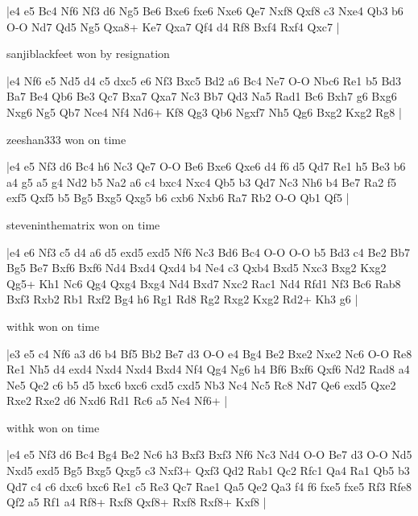 \makegametitle
|e4 e5 Bc4 Nf6 Nf3 d6 Ng5 Be6 Bxe6 fxe6 Nxe6 Qe7 Nxf8 Qxf8 c3 Nxe4 Qb3 b6 O-O Nd7 Qd5 Ng5 Qxa8+ Ke7 Qxa7 Qf4 d4 Rf8 Bxf4 Rxf4 Qxc7  |

\showboard

sanjiblackfeet won by resignation

\makegametitle
|e4 Nf6 e5 Nd5 d4 c5 dxc5 e6 Nf3 Bxc5 Bd2 a6 Bc4 Ne7 O-O Nbc6 Re1 b5 Bd3 Ba7 Be4 Qb6 Be3 Qc7 Bxa7 Qxa7 Nc3 Bb7 Qd3 Na5 Rad1 Bc6 Bxh7 g6 Bxg6 Nxg6 Ng5 Qb7 Nce4 Nf4 Nd6+ Kf8 Qg3 Qb6 Ngxf7 Nh5 Qg6 Bxg2 Kxg2 Rg8  |

\showboard

zeeshan333 won on time

\makegametitle
|e4 e5 Nf3 d6 Bc4 h6 Nc3 Qe7 O-O Be6 Bxe6 Qxe6 d4 f6 d5 Qd7 Re1 h5 Be3 b6 a4 g5 a5 g4 Nd2 b5 Na2 a6 c4 bxc4 Nxc4 Qb5 b3 Qd7 Nc3 Nh6 b4 Be7 Ra2 f5 exf5 Qxf5 b5 Bg5 Bxg5 Qxg5 b6 cxb6 Nxb6 Ra7 Rb2 O-O Qb1 Qf5  |

\showboard

steveninthematrix won on time

\makegametitle
|e4 e6 Nf3 c5 d4 a6 d5 exd5 exd5 Nf6 Nc3 Bd6 Bc4 O-O O-O b5 Bd3 c4 Be2 Bb7 Bg5 Be7 Bxf6 Bxf6 Nd4 Bxd4 Qxd4 b4 Ne4 c3 Qxb4 Bxd5 Nxc3 Bxg2 Kxg2 Qg5+ Kh1 Nc6 Qg4 Qxg4 Bxg4 Nd4 Bxd7 Nxc2 Rac1 Nd4 Rfd1 Nf3 Bc6 Rab8 Bxf3 Rxb2 Rb1 Rxf2 Bg4 h6 Rg1 Rd8 Rg2 Rxg2 Kxg2 Rd2+ Kh3 g6  |

\showboard

withk won on time

\makegametitle
|e3 e5 c4 Nf6 a3 d6 b4 Bf5 Bb2 Be7 d3 O-O e4 Bg4 Be2 Bxe2 Nxe2 Nc6 O-O Re8 Re1 Nh5 d4 exd4 Nxd4 Nxd4 Bxd4 Nf4 Qg4 Ng6 h4 Bf6 Bxf6 Qxf6 Nd2 Rad8 a4 Ne5 Qe2 c6 b5 d5 bxc6 bxc6 cxd5 cxd5 Nb3 Nc4 Nc5 Rc8 Nd7 Qe6 exd5 Qxe2 Rxe2 Rxe2 d6 Nxd6 Rd1 Rc6 a5 Ne4 Nf6+  |

\showboard

withk won on time

\makegametitle
|e4 e5 Nf3 d6 Bc4 Bg4 Be2 Nc6 h3 Bxf3 Bxf3 Nf6 Nc3 Nd4 O-O Be7 d3 O-O Nd5 Nxd5 exd5 Bg5 Bxg5 Qxg5 c3 Nxf3+ Qxf3 Qd2 Rab1 Qc2 Rfc1 Qa4 Ra1 Qb5 b3 Qd7 c4 c6 dxc6 bxc6 Re1 c5 Re3 Qc7 Rae1 Qa5 Qe2 Qa3 f4 f6 fxe5 fxe5 Rf3 Rfe8 Qf2 a5 Rf1 a4 Rf8+ Rxf8 Qxf8+ Rxf8 Rxf8+ Kxf8  |

